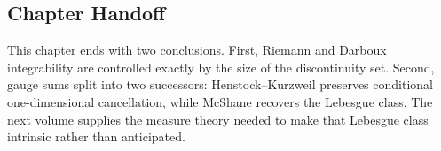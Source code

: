 \subsection*{Chapter Handoff}

\begin{exposition}
This chapter ends with two conclusions. First, Riemann and Darboux
integrability are controlled exactly by the size of the discontinuity set.
Second, gauge sums split into two successors: Henstock--Kurzweil preserves
conditional one-dimensional cancellation, while McShane recovers the Lebesgue
class. The next volume supplies the measure theory needed to make that
Lebesgue class intrinsic rather than anticipated.
\end{exposition}
